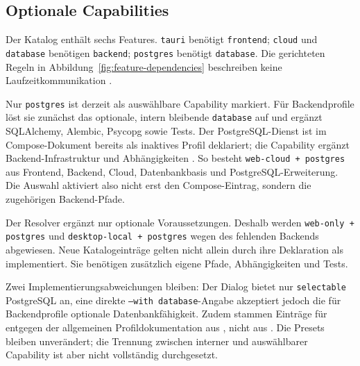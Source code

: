 \subsection{Optionale Capabilities}
\label{subsec:optionale-capabilities}

Der Katalog enthält sechs Features. \texttt{tauri} benötigt
\texttt{frontend}; \texttt{cloud} und \texttt{database} benötigen
\texttt{backend}; \texttt{postgres} benötigt \texttt{database}. Die
gerichteten Regeln in Abbildung~\ref{fig:feature-dependencies} beschreiben
keine Laufzeitkommunikation
\parencite{kleiveist2026profiles,kleiveist2026database}.



Nur \texttt{postgres} ist derzeit als auswählbare Capability markiert. Für
Backendprofile löst sie zunächst das optionale, intern bleibende
\texttt{database} auf und ergänzt SQLAlchemy, Alembic, Psycopg sowie Tests. Der
PostgreSQL-Dienst ist im Compose-Dokument bereits als inaktives Profil
deklariert; die Capability ergänzt Backend-Infrastruktur und Abhängigkeiten
\parencite{kleiveist2026deployment,kleiveist2026template}.
So besteht \texttt{web-cloud + postgres} aus Frontend, Backend, Cloud,
Datenbankbasis und PostgreSQL-Erweiterung. Die Auswahl aktiviert also nicht
erst den Compose-Eintrag, sondern die zugehörigen Backend-Pfade.

Der Resolver ergänzt nur optionale Voraussetzungen. Deshalb werden
\texttt{web-only + postgres} und \texttt{desktop-local + postgres} wegen des
fehlenden Backends abgewiesen. Neue Katalogeinträge gelten nicht allein durch
ihre Deklaration als implementiert.
Sie benötigen zusätzlich eigene Pfade, Abhängigkeiten und Tests.

Zwei Implementierungsabweichungen bleiben: Der Dialog bietet nur
\texttt{selectable} PostgreSQL an, eine direkte \texttt{--with database}-Angabe
akzeptiert jedoch die für Backendprofile optionale Datenbankfähigkeit. Zudem
stammen Einträge für  entgegen der allgemeinen
Profildokumentation aus , nicht aus
. Die Presets bleiben unverändert; die Trennung zwischen
interner und auswählbarer Capability ist aber nicht vollständig durchgesetzt.
